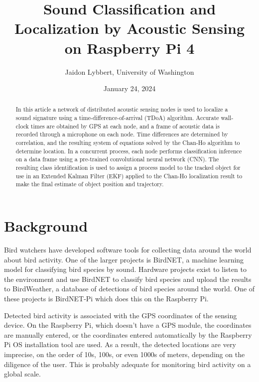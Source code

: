\documentclass[12pt]{article}
\begin{document}
\title{Sound Classification and Localization by Acoustic Sensing on Raspberry Pi 4}
\author{Jaidon Lybbert, University of Washington}
\date{January 24, 2024}

\maketitle

\begin{abstract}
	In this article a network of distributed acoustic sensing nodes is used to localize a sound signature using a time-difference-of-arrival (TDoA) algorithm. Accurate wall-clock times are obtained by GPS at each node, and a frame of acoustic data is recorded through a microphone on each node. Time differences are determined by correlation, and the resulting system of equations solved by the Chan-Ho algorithm to determine location. In a concurrent process, each node performs classification inference on a data frame using a pre-trained convolutional neural network (CNN). The resulting class identification is used to assign a process model to the tracked object for use in an Extended Kalman Filter (EKF) applied to the Chan-Ho localization result to make the final estimate of object position and trajectory.
\end{abstract}


\section{Background}\label{sec:background}

Bird watchers have developed software tools for collecting data around the world about bird activity. One of the larger projects is BirdNET, a machine learning model for classifying bird species by sound. Hardware projects exist to listen to the environment and use BirdNET to classify bird species and upload the results to BirdWeather, a database of detections of bird species around the world. One of these projects is BirdNET-Pi which does this on the Raspberry Pi. 

Detected bird activity is associated with the GPS coordinates of the sensing device. On the Raspberry Pi, which doesn't have a GPS module, the coordinates are manually entered, or the coordinates entered automatically by the Raspberry Pi OS installation tool are used. As a result, the detected locations are very imprecise, on the order of 10s, 100s, or even 1000s of meters, depending on the diligence of the user. This is probably adequate for monitoring bird activity on a global scale.
\end{document}
